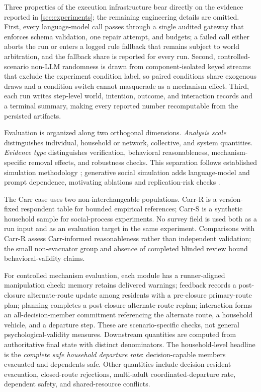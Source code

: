 \documentclass[journal]{IEEEtran}
\begin{document}
Three properties of the execution infrastructure bear directly on the evidence
reported in \cref{sec:experiments}; the remaining engineering details are
omitted. First, every language-model call passes through a single audited
gateway that enforces schema validation, one repair attempt, and budgets; a
failed call either aborts the run or enters a logged rule fallback that remains
subject to world arbitration, and the fallback share is reported for every run.
Second, controlled-scenario non-LLM randomness is drawn from
component-isolated keyed streams that exclude the experiment condition label,
so paired conditions share exogenous draws and a condition switch cannot
masquerade as a mechanism effect. Third, each run writes step-level world,
intention, outcome, and interaction records and a terminal summary, making
every reported number recomputable from the persisted artifacts.


Evaluation is organized along two orthogonal dimensions. \emph{Analysis scale}
distinguishes individual, household or network, collective, and system
quantities. \emph{Evidence type} distinguishes verification, behavioral
reasonableness, mechanism-specific removal effects, and robustness checks.
This separation follows established simulation methodology
\cite{sargent2013verification,klugl2008validation,grimm2005pattern}; generative
social simulation adds language-model and prompt dependence, motivating
ablations and replication-risk checks
\cite{park2023generativeagents,bail2024generativeai}.

The Carr case uses two non-interchangeable populations. Carr-R is a
version-fixed respondent table for bounded empirical references; Carr-S is a
synthetic household sample for social-process experiments. No survey field is
used both as a run input and as an evaluation target in the same experiment.
Comparisons with Carr-R assess Carr-informed reasonableness rather than
independent validation; the small non-evacuator group and absence of completed
blinded review bound behavioral-validity claims.

For controlled mechanism evaluation, each module has a runner-aligned
manipulation check: memory retains delivered warnings; feedback records a
post-closure alternate-route update among residents with a pre-closure
primary-route plan; planning completes a post-closure alternate-route replan;
interaction forms an all-decision-member commitment referencing the alternate
route, a household vehicle, and a departure step. These are scenario-specific
checks, not general psychological-validity measures. Downstream quantities are
computed from authoritative final state with distinct denominators. The
household-level headline is the \emph{complete safe household departure rate}:
decision-capable members evacuated and dependents safe. Other quantities
include decision-resident evacuation, closed-route rejections, multi-adult
coordinated-departure rate, dependent safety, and shared-resource conflicts.
\end{document}
